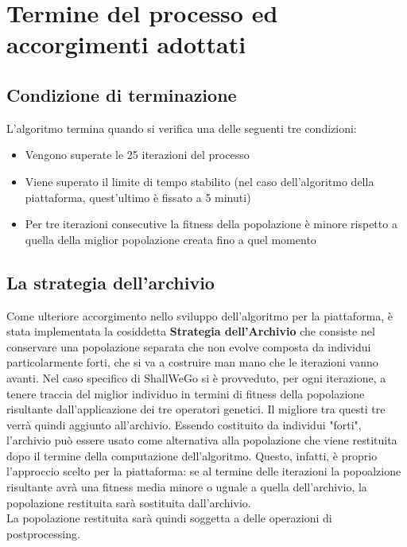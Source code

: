 \section{Termine del processo ed accorgimenti adottati}

    \subsection{Condizione di terminazione}
        L'algoritmo termina quando si verifica una delle seguenti tre condizioni:

        \begin{itemize}
            \item Vengono superate le 25 iterazioni del processo
            \item Viene superato il limite di tempo stabilito (nel caso dell'algoritmo della piattaforma, quest'ultimo è fissato a 5 minuti)
            \item Per tre iterazioni consecutive la fitness della popolazione è minore rispetto a quella della miglior popolazione creata fino a quel momento
        \end{itemize}

        \subsection{La strategia dell'archivio}
            Come ulteriore accorgimento nello sviluppo dell'algoritmo per la piattaforma, è stata implementata la cosiddetta \textbf{Strategia dell'Archivio} che consiste nel conservare una popolazione separata che non evolve composta da individui particolarmente forti, che si va a costruire man mano che le iterazioni vanno avanti. Nel caso specifico di ShallWeGo si è provveduto, per ogni iterazione, a tenere traccia del miglior individuo in termini di fitness della popolazione risultante dall'applicazione dei tre operatori genetici. Il migliore tra questi tre verrà quindi aggiunto all'archivio.
            Essendo costituito da individui "forti", l'archivio può essere usato come alternativa alla popolazione che viene restituita dopo il termine della computazione dell'algoritmo. Questo, infatti, è proprio l'approccio scelto per la piattaforma: se al termine delle iterazioni la popoalzione risultante avrà una fitness media minore o uguale a quella dell'archivio, la popolazione restituita sarà sostituita dall'archivio. \\
            La popolazione restituita sarà quindi soggetta a delle operazioni di postprocessing.

